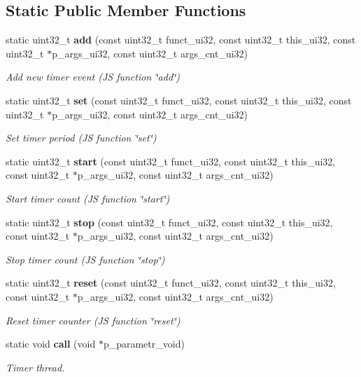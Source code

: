 \subsection*{Static Public Member Functions}
\begin{DoxyCompactItemize}
\item 
static uint32\+\_\+t \textbf{ add} (const uint32\+\_\+t funct\+\_\+ui32, const uint32\+\_\+t this\+\_\+ui32, const uint32\+\_\+t $\ast$p\+\_\+args\+\_\+ui32, const uint32\+\_\+t args\+\_\+cnt\+\_\+ui32)
\begin{DoxyCompactList}\small\item\em Add new timer event (JS function \char`\"{}add\char`\"{}) \end{DoxyCompactList}\item 
static uint32\+\_\+t \textbf{ set} (const uint32\+\_\+t funct\+\_\+ui32, const uint32\+\_\+t this\+\_\+ui32, const uint32\+\_\+t $\ast$p\+\_\+args\+\_\+ui32, const uint32\+\_\+t args\+\_\+cnt\+\_\+ui32)
\begin{DoxyCompactList}\small\item\em Set timer period (JS function \char`\"{}set\char`\"{}) \end{DoxyCompactList}\item 
static uint32\+\_\+t \textbf{ start} (const uint32\+\_\+t funct\+\_\+ui32, const uint32\+\_\+t this\+\_\+ui32, const uint32\+\_\+t $\ast$p\+\_\+args\+\_\+ui32, const uint32\+\_\+t args\+\_\+cnt\+\_\+ui32)
\begin{DoxyCompactList}\small\item\em Start timer count (JS function \char`\"{}start\char`\"{}) \end{DoxyCompactList}\item 
static uint32\+\_\+t \textbf{ stop} (const uint32\+\_\+t funct\+\_\+ui32, const uint32\+\_\+t this\+\_\+ui32, const uint32\+\_\+t $\ast$p\+\_\+args\+\_\+ui32, const uint32\+\_\+t args\+\_\+cnt\+\_\+ui32)
\begin{DoxyCompactList}\small\item\em Stop timer count (JS function \char`\"{}stop\char`\"{}) \end{DoxyCompactList}\item 
static uint32\+\_\+t \textbf{ reset} (const uint32\+\_\+t funct\+\_\+ui32, const uint32\+\_\+t this\+\_\+ui32, const uint32\+\_\+t $\ast$p\+\_\+args\+\_\+ui32, const uint32\+\_\+t args\+\_\+cnt\+\_\+ui32)
\begin{DoxyCompactList}\small\item\em Reset timer counter (JS function \char`\"{}reset\char`\"{}) \end{DoxyCompactList}\item 
static void \textbf{ call} (void $\ast$p\+\_\+parametr\+\_\+void)
\begin{DoxyCompactList}\small\item\em Timer thread. \end{DoxyCompactList}\end{DoxyCompactItemize}


